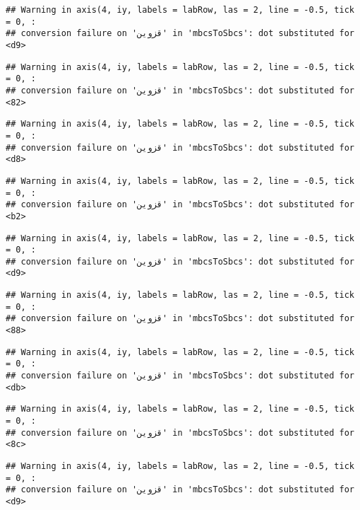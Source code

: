 \documentclass[
]{article}
\begin{document}
\begin{verbatim}
## Warning in axis(4, iy, labels = labRow, las = 2, line = -0.5, tick = 0, :
## conversion failure on 'قزوین' in 'mbcsToSbcs': dot substituted for <d9>
\end{verbatim}

\begin{verbatim}
## Warning in axis(4, iy, labels = labRow, las = 2, line = -0.5, tick = 0, :
## conversion failure on 'قزوین' in 'mbcsToSbcs': dot substituted for <82>
\end{verbatim}

\begin{verbatim}
## Warning in axis(4, iy, labels = labRow, las = 2, line = -0.5, tick = 0, :
## conversion failure on 'قزوین' in 'mbcsToSbcs': dot substituted for <d8>
\end{verbatim}

\begin{verbatim}
## Warning in axis(4, iy, labels = labRow, las = 2, line = -0.5, tick = 0, :
## conversion failure on 'قزوین' in 'mbcsToSbcs': dot substituted for <b2>
\end{verbatim}

\begin{verbatim}
## Warning in axis(4, iy, labels = labRow, las = 2, line = -0.5, tick = 0, :
## conversion failure on 'قزوین' in 'mbcsToSbcs': dot substituted for <d9>
\end{verbatim}

\begin{verbatim}
## Warning in axis(4, iy, labels = labRow, las = 2, line = -0.5, tick = 0, :
## conversion failure on 'قزوین' in 'mbcsToSbcs': dot substituted for <88>
\end{verbatim}

\begin{verbatim}
## Warning in axis(4, iy, labels = labRow, las = 2, line = -0.5, tick = 0, :
## conversion failure on 'قزوین' in 'mbcsToSbcs': dot substituted for <db>
\end{verbatim}

\begin{verbatim}
## Warning in axis(4, iy, labels = labRow, las = 2, line = -0.5, tick = 0, :
## conversion failure on 'قزوین' in 'mbcsToSbcs': dot substituted for <8c>
\end{verbatim}

\begin{verbatim}
## Warning in axis(4, iy, labels = labRow, las = 2, line = -0.5, tick = 0, :
## conversion failure on 'قزوین' in 'mbcsToSbcs': dot substituted for <d9>
\end{verbatim}
\end{document}
